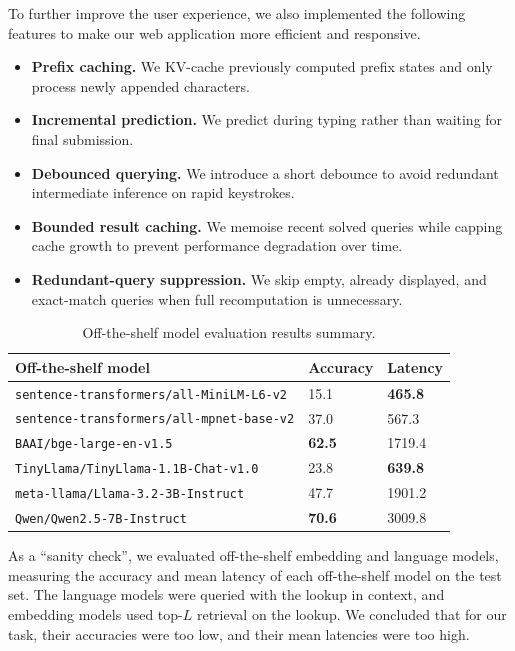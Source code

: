 \documentclass{article}
\theoremstyle{definition}
\begin{document}
To further improve the user experience,
we also implemented the following features to make our web application more efficient and responsive.
\begin{itemize}
	\item \textbf{Prefix caching.} We KV-cache previously computed prefix states and only process newly appended characters.
	\item \textbf{Incremental prediction.} We predict during typing rather than waiting for final submission.
	\item \textbf{Debounced querying.} We introduce a short debounce to avoid redundant intermediate inference on rapid keystrokes.
	\item \textbf{Bounded result caching.} We memoise recent solved queries while capping cache growth to prevent performance degradation over time.
	\item \textbf{Redundant-query suppression.} We skip empty, already displayed, and exact-match queries when full recomputation is unnecessary.
\end{itemize}

\newpage

\begin{table}[H]
	\centering
	\begin{tabular}{lll}
		\toprule
		\textbf{Off-the-shelf model} & \textbf{Accuracy} & \textbf{Latency} \\
		\midrule
		\texttt{sentence-transformers/all-MiniLM-L6-v2} & 15.1 & \textbf{465.8} \\
		\texttt{sentence-transformers/all-mpnet-base-v2} & 37.0 & 567.3 \\
		\texttt{BAAI/bge-large-en-v1.5} & \textbf{62.5} & 1719.4 \\
		\midrule
		\texttt{TinyLlama/TinyLlama-1.1B-Chat-v1.0} & 23.8 & \textbf{639.8} \\
		\texttt{meta-llama/Llama-3.2-3B-Instruct} & 47.7 & 1901.2 \\
		\texttt{Qwen/Qwen2.5-7B-Instruct} & \textbf{70.6} & 3009.8 \\
		\bottomrule
	\end{tabular}
	\caption{Off-the-shelf model evaluation results summary.}
\end{table}

As a ``sanity check'',
we evaluated off-the-shelf embedding and language models,
measuring the accuracy and mean latency of each off-the-shelf model on the test set.
The language models were queried with the lookup in context,
and embedding models used top-$L$ retrieval on the lookup.
We concluded that for our task, their accuracies were too low, and their mean latencies were too high.
\end{document}
